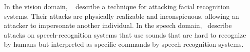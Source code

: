 In the vision domain, ~\cite{sharif2016accessorize} describe a technique for attacking facial recognition systems. Their attacks are physically realizable and inconspicuous, allowing an attacker to impersonate another individual. In the speech domain,~\cite{carlini2016hidden} describe attacks on speech-recognition systems that use sounds that are hard to recognize by humans but interpreted as specific commands by speech-recognition systems.
